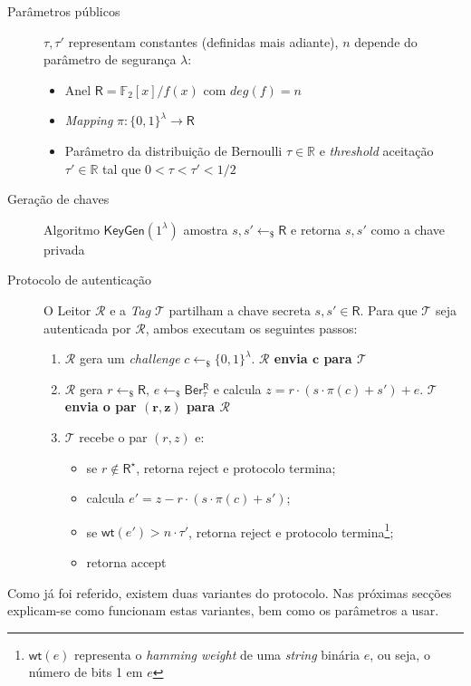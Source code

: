 \begin{description}
  \item[Parâmetros públicos] $\tau, \tau'$ representam constantes (definidas mais adiante), $n$ depende do parâmetro de segurança $\lambda$:
    \begin{itemize}
      \item Anel $\mathsf{R} = \mathbb{F}_2[x]/f(x)$ com $deg(f) = n$
      \item \textit{Mapping} $\pi : \{0,1\}^\lambda \rightarrow \mathsf{R}$
      \item Parâmetro da distribuição de Bernoulli $\tau \in \mathbb{R}$ e \textit{threshold} aceitação $\tau' \in \mathbb{R}$ tal que $0 < \tau < \tau' < 1/2$
    \end{itemize}
  \item[Geração de chaves] Algoritmo $\mathsf{KeyGen}(1^\lambda)$ amostra $s, s' \longleftarrow_{\$} \mathsf{R}$ e retorna $s, s'$ como a chave privada
  \item[Protocolo de autenticação] O Leitor $\mathcal{R}$ e a \textit{Tag} $\mathcal{T}$ partilham a chave secreta $s, s' \in \mathsf{R}$. Para que $\mathcal{T}$ seja autenticada por $\mathcal{R}$, ambos executam os seguintes passos:
    \begin{enumerate}
      \item $\mathcal{R}$ gera um \textit{challenge} $c \longleftarrow_{\$} \{0,1\}^\lambda$. \textbf{$\mathbf{\mathcal{R}}$ envia $\mathbf{c}$ para $\mathbf{\mathcal{T}}$}
      \item $\mathcal{R}$ gera $r \longleftarrow_{\$} \mathsf{R}$, $e \longleftarrow_{\$} \mathsf{Ber^{R}_\tau}$ e calcula $z = r \cdot (s \cdot \pi(c) + s') + e$. \textbf{$\mathbf{\mathcal{T}}$ envia o par $\mathbf{(r,z)}$ para $\mathbf{\mathcal{R}}$}
      \item $\mathcal{T}$ recebe o par $(r,z)$ e:
        \begin{itemize}
          \item se $r \notin \mathsf{R}^\star$, retorna \textsf{reject} e protocolo termina;
          \item calcula $e' = z - r \cdot (s \cdot \pi(c) + s')$;
          \item se $\mathsf{wt}(e') > n \cdot \tau'$, retorna \textsf{reject} e protocolo termina\footnote{$\mathsf{wt}(e)$ representa o \textit{hamming weight} de uma \textit{string} binária $e$, ou seja, o número de bits 1 em $e$};
          \item retorna \textsf{accept}
        \end{itemize}
    \end{enumerate}
\end{description}
Como já foi referido, existem duas variantes do protocolo. Nas próximas secções explicam-se como funcionam estas variantes, bem como os parâmetros a usar.

